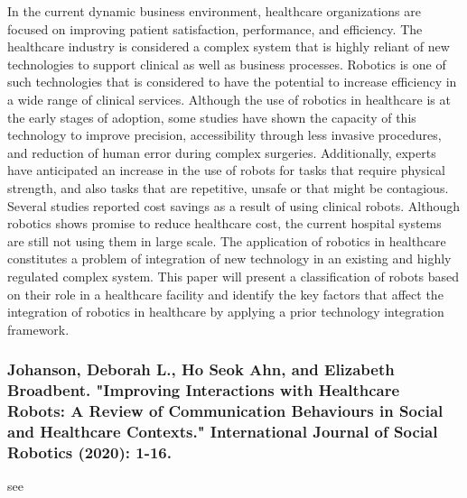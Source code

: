 \documentclass[conference]{IEEEtran}
\begin{document}
In the current dynamic business environment, healthcare organizations are focused on improving patient satisfaction, performance, and efficiency. The healthcare industry is considered a complex system that is highly reliant of new technologies to support clinical as well as business processes. Robotics is one of such technologies that is considered to have the potential to increase efficiency in a wide range of clinical services. Although the use of robotics in healthcare is at the early stages of adoption, some studies have shown the capacity of this technology to improve precision, accessibility through less invasive procedures, and reduction of human error during complex surgeries. Additionally, experts have anticipated an increase in the use of robots for tasks that require physical strength, and also tasks that are repetitive, unsafe or that might be contagious. Several studies reported cost savings as a result of using clinical robots. Although robotics shows promise to reduce healthcare cost, the current hospital systems are still not using them in large scale. The application of robotics in healthcare constitutes a problem of integration of new technology in an existing and highly regulated complex system. This paper will present a classification of robots based on their role in a healthcare facility and identify the key factors that affect the integration of robotics in healthcare by applying a prior technology integration framework. 

\medskip
\subsubsection{Johanson, Deborah L., Ho Seok Ahn, and Elizabeth Broadbent. "Improving Interactions with Healthcare Robots: A Review of Communication Behaviours in Social and Healthcare Contexts." International Journal of Social Robotics (2020): 1-16.}
see \cite{johanson2020improving}
\end{document}
